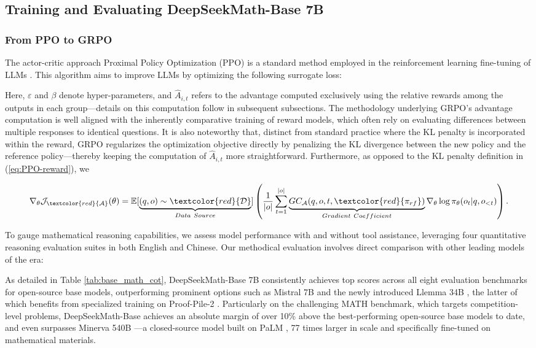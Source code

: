 \subsection{Training and Evaluating DeepSeekMath-Base 7B}

\subsubsection{From PPO to GRPO} The actor-critic approach Proximal Policy Optimization (PPO) \citep{schulman2017proximal} is a standard method employed in the reinforcement learning fine-tuning of LLMs \citep{ouyang2022training}. This algorithm aims to improve LLMs by optimizing the following surrogate loss:

Here, $\varepsilon$ and $\beta$ denote hyper-parameters, and $\hat{A}_{i,t}$ refers to the advantage computed exclusively using the relative rewards among the outputs in each group—details on this computation follow in subsequent subsections. The methodology underlying GRPO’s advantage computation is well aligned with the inherently comparative training of reward models, which often rely on evaluating differences between multiple responses to identical questions. It is also noteworthy that, distinct from standard practice where the KL penalty is incorporated within the reward, GRPO regularizes the optimization objective directly by penalizing the KL divergence between the new policy and the reference policy—thereby keeping the computation of $\hat{A}_{i,t}$ more straightforward. Furthermore, as opposed to the KL penalty definition in (\ref{eq:PPO-reward}), we

\begin{equation}
    \nabla_{\theta}\mathcal{J}_{\textcolor{red}{\mathcal{A}}}(\theta) = \mathbb{E}[\underbrace{(q,o) \sim \textcolor{red}{\mathcal{D}}}_{Data \ Source}]\left( \frac{1}{|o|} \sum_{t=1}^{|o|}  \underbrace{GC_{{\mathcal{A}}}(q, o, t, \textcolor{red}{\pi_{{rf}}})}_{Gradient \ Coefficient}  \nabla_{\theta}\log \pi_{\theta}(o_t | q, o_{<t})\right).
\label{eq:objective}
\end{equation}

To gauge mathematical reasoning capabilities, we assess model performance with and without tool assistance, leveraging four quantitative reasoning evaluation suites in both English and Chinese. Our methodical evaluation involves direct comparison with other leading models of the era:

As detailed in Table \ref{tab:base_math_cot}, DeepSeekMath-Base 7B consistently achieves top scores across all eight evaluation benchmarks for open-source base models, outperforming prominent options such as Mistral 7B \citep{mistral} and the newly introduced Llemma 34B \citep{llemma}, the latter of which benefits from specialized training on Proof-Pile-2 \citep{llemma}. Particularly on the challenging MATH benchmark, which targets competition-level problems, DeepSeekMath-Base achieves an absolute margin of over 10\% above the best-performing open-source base models to date, and even surpasses Minerva 540B \citep{minerva}—a closed-source model built on PaLM \citep{palm}, 77 times larger in scale and specifically fine-tuned on mathematical materials.

